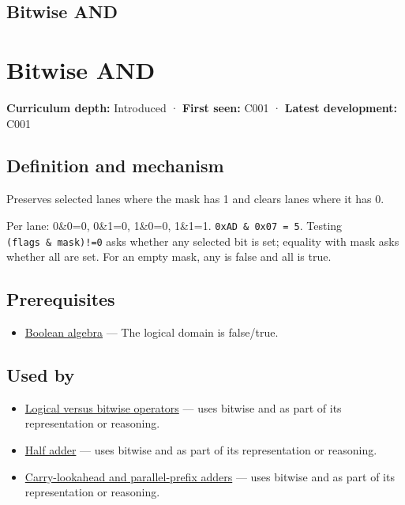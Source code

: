 \hypertarget{appendix-68b52453737c}{}
\section*{Bitwise AND}
\chapter{Bitwise AND}\label{appendix-68b52453737c-bitwise-and}

\textbf{Curriculum depth:} Introduced · \textbf{First seen:} C001 · \textbf{Latest development:} C001

\section{Definition and mechanism}\label{appendix-68b52453737c-definition-and-mechanism}

Preserves selected lanes where the mask has 1 and clears lanes where it has 0.

Per lane: 0\&0=0, 0\&1=0, 1\&0=0, 1\&1=1. \texttt{0xAD\ \&\ 0x07\ =\ 5}. Testing \texttt{(flags\ \&\ mask)!=0} asks whether any selected bit is set; equality with mask asks whether all are set. For an empty mask, any is false and all is true.

\section{Prerequisites}\label{appendix-68b52453737c-prerequisites}

\begin{itemize}
\tightlist
\item
  \hyperref[appendix-24475e1596a8]{Boolean algebra} --- The logical domain is false/true.
\end{itemize}

\section{Used by}\label{appendix-68b52453737c-used-by}

\begin{itemize}
\tightlist
\item
  \hyperref[appendix-fe6b457d68d8]{Logical versus bitwise operators} --- uses bitwise and as part of its representation or reasoning.
\item
  \hyperref[appendix-1652d27a8e90]{Half adder} --- uses bitwise and as part of its representation or reasoning.
\item
  \hyperref[appendix-b5c46b2d94ff]{Carry-lookahead and parallel-prefix adders} --- uses bitwise and as part of its representation or reasoning.
\end{itemize}

